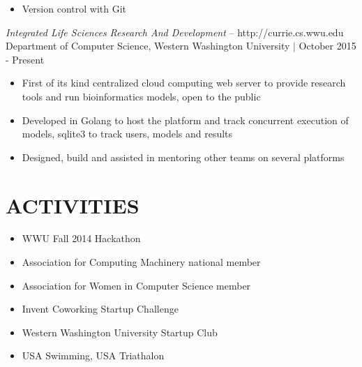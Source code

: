 \documentclass[line,margin]{res}
\begin{document}
\begin{resume}
\begin{itemize}
		\item Version control with Git
	\end{itemize}
	{\sl Integrated Life Sciences Research And Development} -- {\footnotesize http://currie.cs.wwu.edu} \\
	{\footnotesize Department of Computer Science, Western Washington University $|$ October 2015 - Present}
	\begin{itemize}\itemsep -2pt
		\item First of its kind centralized cloud computing web server to provide research tools and run bioinformatics models, open to the public
		\item Developed in Golang to host the platform and track concurrent execution of models, sqlite3 to track users, models and results
		\item Designed, build and assisted in mentoring other teams on several platforms
	\end{itemize}


\section{ACTIVITIES}
	\begin{itemize} \itemsep -3pt
	\item WWU Fall 2014 Hackathon
	\item Association for Computing Machinery national member
	\item Association for Women in Computer Science member
	\item Invent Coworking Startup Challenge
	\item Western Washington University Startup Club
	\item USA Swimming, USA Triathalon
	\end{itemize}


\end{resume}
\end{document}
